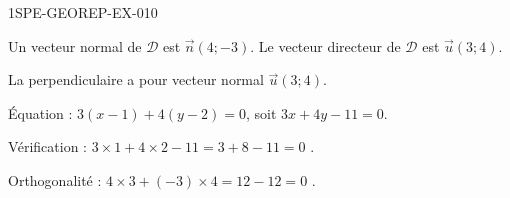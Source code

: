 \begin{corrige}{1SPE-GEOREP-EX-010}


Un vecteur normal de $\mathcal{D}$ est $\vec{n}(4 ; -3)$. Le vecteur directeur de $\mathcal{D}$ est $\vec{u}(3 ; 4)$.

La perpendiculaire a pour vecteur normal $\vec{u}(3 ; 4)$.

Équation : $3(x - 1) + 4(y - 2) = 0$, soit $\boxed{3x + 4y - 11 = 0}$.

Vérification : $3 \times 1 + 4 \times 2 - 11 = 3 + 8 - 11 = 0$ \checkmark.

Orthogonalité : $4 \times 3 + (-3) \times 4 = 12 - 12 = 0$ \checkmark.

\end{corrige}
